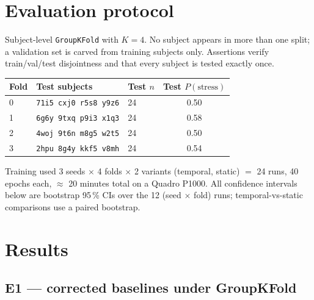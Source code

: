 \documentclass[11pt,a4paper]{article}
\newcommand{\code}[1]{\texttt{\small #1}}
\begin{document}
\section{Evaluation protocol}

Subject-level \code{GroupKFold} with $K=4$. No subject appears in more than one split;
a validation set is carved from training subjects only. Assertions verify train/val/test
disjointness and that every subject is tested exactly once.

\begin{center}\small
\begin{tabular}{lllc}
\toprule
Fold & Test subjects & Test $n$ & Test $P(\text{stress})$ \\
\midrule
0 & \code{71i5 cxj0 r5s8 y9z6} & 24 & 0.50 \\
1 & \code{6g6y 9txq p9i3 x1q3} & 24 & 0.58 \\
2 & \code{4woj 9t6n m8g5 w2t5} & 24 & 0.50 \\
3 & \code{2hpu 8g4y kkf5 v8mh} & 24 & 0.54 \\
\bottomrule
\end{tabular}
\end{center}

\noindent
Training used 3 seeds $\times$ 4 folds $\times$ 2 variants (temporal, static) $=$ 24 runs,
40 epochs each, $\approx$ 20 minutes total on a Quadro P1000. All confidence intervals
below are bootstrap 95\,\% CIs over the 12 (seed $\times$ fold) runs; temporal-vs-static
comparisons use a paired bootstrap.

\section{Results}\label{sec:results}

\subsection{E1 --- corrected baselines under GroupKFold}
\end{document}
